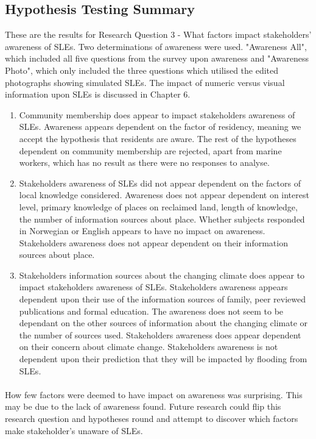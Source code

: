 \subsection{Hypothesis Testing Summary}
These are the results for Research Question 3 - What factors impact stakeholders' awareness of SLEs. Two determinations of awareness were used. "Awareness All", which included all five questions from the survey upon awareness and "Awareness Photo", which only included the three questions which utilised the edited photographs showing simulated SLEs. The impact of numeric versus visual information upon SLEs is discussed in Chapter 6.
\begin{enumerate}
    \item Community membership does appear to impact stakeholders awareness of SLEs. Awareness appears dependent on the factor of residency, meaning we accept the hypothesis that residents are aware. The rest of the hypotheses dependent on community membership are rejected, apart from marine workers, which has no result as there were no responses to analyse.
  
    \item Stakeholders awareness of SLEs did not appear dependent on the factors of local knowledge considered. Awareness does not appear dependent on interest level, primary knowledge of places on reclaimed land, length of knowledge, the number of information sources about place. Whether subjects responded in Norwegian or English appears to have no impact on awareness. Stakeholders awareness does not appear dependent on their information sources about place. 

    \item  Stakeholders information sources about the changing climate does appear to impact stakeholders awareness of SLEs. Stakeholders awareness appears dependent upon their use of the information sources of family, peer reviewed publications and formal education. The awareness does not seem to be dependant on the other sources of information about the changing climate or the number of sources used. Stakeholders awareness does appear dependent on their concern about climate change. Stakeholders awareness is not dependent upon their prediction that they will be impacted by flooding from SLEs.
\end{enumerate}
\paragraph{}
How few factors were deemed to have impact on awareness was surprising. This may be due to the lack of awareness found.  Future research could flip this research question and hypotheses round and attempt to discover which factors make stakeholder's unaware of SLEs. 








